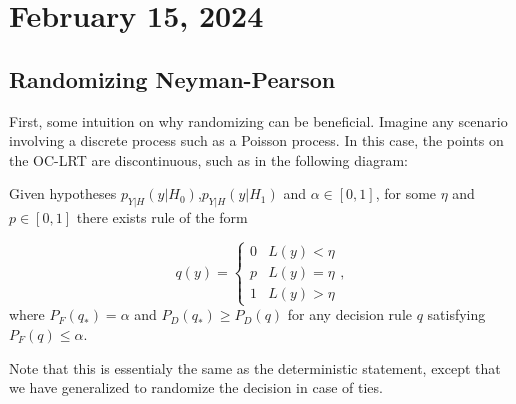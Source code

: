 \section{February 15, 2024}

\subsection{Randomizing Neyman-Pearson}

First, some intuition on why randomizing can be beneficial. Imagine any scenario involving a discrete process such as a Poisson process. In this case, the points on the OC-LRT are discontinuous, such as in the following diagram: 



\begin{theorem}

Given hypotheses $p_{Y|H}(y|H_0)$,$p_{Y|H}(y|H_1)$ and $\alpha\in [0,1]$, for some $\eta$ and $p\in [0,1]$ there exists rule of the form 

\[
q(y) = \begin{cases}
	0 & L(y) < \eta \\
	p & L(y) = \eta \\
	1 & L(y) > \eta
\end{cases},
\] 
where $P_F(q_*) = \alpha$ and $P_D(q_*)\geq P_D(q)$ for any decision rule $q$ satisfying $P_F(q)\leq \alpha$.
\end{theorem}
Note that this is essentialy the same as the deterministic statement, except that we have generalized to randomize the decision in case of ties. 
